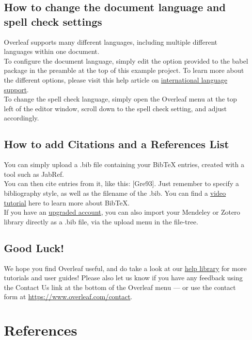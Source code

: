 \documentclass{article}
\begin{document}
\subsection{How to change the document language and spell check settings}
Overleaf supports many different languages, including multiple different languages within one document.\\
To configure the document language, simply edit the option provided to the babel package in the preamble at the top of this example project. To learn more about the different options, please visit this help article on \href{https://www.overleaf.com/learn/latex/International_language_support}{international language support}.\\
To change the spell check language, simply open the Overleaf menu at the top left of the editor
window, scroll down to the spell check setting, and adjust accordingly.

\subsection{How to add Citations and a References List}
You can simply upload a .bib file containing your BibTeX entries, created with a tool such as JabRef.\\
You can then cite entries from it, like this: [Gre93]\cite{hull2008defrosting}. Just remember to specify a bibliography style, as well as the filename of the .bib. You can find a \href{https://www.overleaf.com/learn/latex/Questions/How_to_include_a_bibliography_using_bibtex}{video tutorial}
 here to learn more about BibTeX.\\
If you have an \href{https://www.overleaf.com/user/subscription/plans}{upgraded account}, 
you can also import your Mendeley or Zotero library directly as a .bib file, via the upload menu in the file-tree.
\subsection{Good Luck!}
We hope you find Overleaf useful, and do take a look at our  \href{https://www.overleaf.com/learn}{help library}
 for more tutorials and user
guides! Please also let us know if you have any feedback using the Contact Us link at the bottom of
the Overleaf menu — or use the contact form at \href{https://www.overleaf.com/contact}{https://www.overleaf.com/contact}.
\section{References}

 
\end{document}
